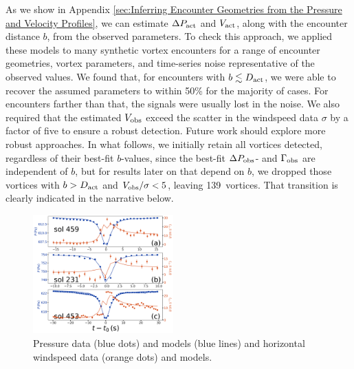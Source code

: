 \documentclass{aastex63}
\newcommand{\boverDactltone}{139}
\begin{document}
As we show in Appendix \ref{sec:Inferring Encounter Geometries from the Pressure and Velocity Profiles}, we can estimate $\Delta P_{\rm act}$ and $V_{\rm act}$, along with the encounter distance $b$, from the observed parameters. To check this approach, we applied these models to many synthetic vortex encounters for a range of encounter geometries, vortex parameters, and time-series noise representative of the observed values. We found that, for encounters with $b \lesssim D_{\rm act}$, we were able to recover the assumed parameters to within 50\% for the majority of cases. For encounters farther than that, the signals were usually lost in the noise. We also required that the estimated $V_{\rm obs}$ exceed the scatter in the windspeed data $\sigma$ by a factor of five to ensure a robust detection. Future work should explore more robust approaches. In what follows, we initially retain all vortices detected, regardless of their best-fit $b$-values, since the best-fit $\Delta P_{\rm obs}$- and $\Gamma_{\rm obs}$ are independent of $b$, but for results later on that depend on $b$, we dropped those vortices with $b > D_{\rm act}$ and $V_{\rm obs}/\sigma < 5$, leaving \boverDactltone\ vortices. That transition is clearly indicated in the narrative below.

\begin{figure}
\centering
\includegraphics[width=0.48\textwidth]{figures/vortices_and_windspeed.png}
\caption{Pressure data (blue dots) and models (blue lines) and horizontal windspeed data (orange dots) and models. \label{fig:vortices_and_windspeed}}
\end{figure}
\end{document}
